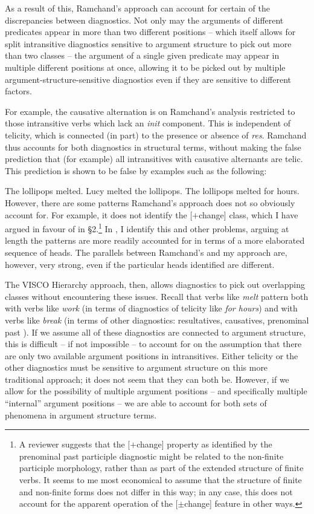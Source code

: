 \documentclass[output=paper]{langsci/langscibook}
\begin{document}
As a result of this, Ramchand’s approach can account for certain of the
discrepancies between  diagnostics. Not only may the
arguments of different predicates appear in more than two different positions –
which itself allows for split intransitive diagnostics sensitive to argument
structure to pick out more than two classes – the argument of a single given
predicate may appear in multiple different positions at once, allowing it to be
picked out by multiple argument-structure-sensitive diagnostics even if they
are sensitive to different factors.

For example, the causative alternation is on Ramchand’s analysis restricted to
those intransitive verbs which lack an \emph{init} component. This is
independent of telicity, which is connected (in part) to the presence or
absence of \emph{res}. Ramchand thus accounts for both diagnostics in
structural terms, without making the false prediction that (for example) all
intransitives with causative alternants are telic. This prediction is shown to
be false by examples such as the following:

\ea
    \ea The lollipops melted.
    \ex Lucy melted the lollipops.
    \z
\z
\ea
    The lollipops melted for hours.
\z
However, there are some patterns Ramchand’s approach does not so obviously
account for. For example, it does not identify the [$+$change] class, which I
have argued in favour of in §2.\footnote{A reviewer suggests that the
    [$+$change] property as identified by the prenominal past participle
    diagnostic might be related to the non-finite participle morphology, rather
    than as part of the extended structure of finite verbs. It seems to me most
    economical to assume that the structure of finite and non-finite forms does
    not differ in this way; in any case, this does not account for the apparent
operation of the [$\pm$change] feature in other ways.}  In \citet{Baker2018}, I
identify this and other problems, arguing at length the patterns are more
readily accounted for in terms of a more elaborated sequence of heads. The
parallels between Ramchand’s and my approach are, however, very strong, even if
the particular heads identified are different.

The VISCO Hierarchy approach, then, allows diagnostics to pick out overlapping
classes without encountering these issues. Recall that verbs like \emph{melt}
pattern both with verbs like \emph{work} (in terms of diagnostics of telicity
like \emph{for hours}) and with verbs like \emph{break} (in terms of other
diagnostics: resultatives, causatives, prenominal past ). If we
assume all of these diagnostics are connected to argument structure, this is
difficult – if not impossible – to account for on the assumption that there are
only two available argument positions in intransitives. Either telicity or the
other diagnostics must be sensitive to argument structure on this more
traditional approach; it does not seem that they can both be. However, if we
allow for the possibility of multiple argument positions – and specifically
multiple \enquote{internal} argument positions – we are able to account for
both sets of phenomena in argument structure terms.
\end{document}
